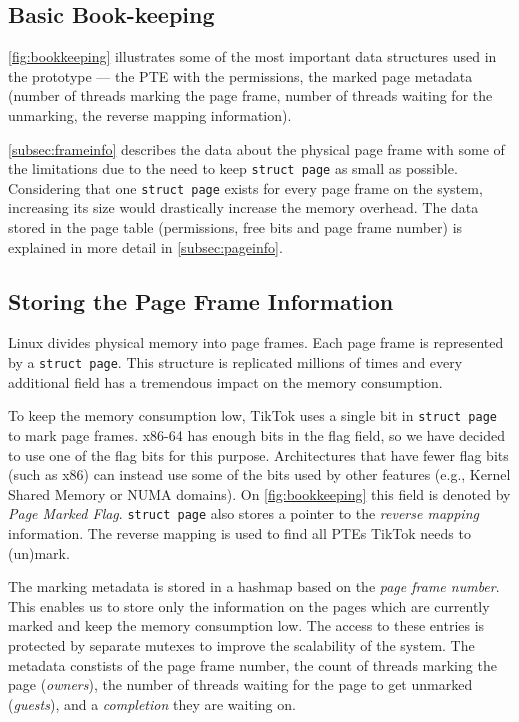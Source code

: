 \documentclass[conference]{IEEEtran}
\newcommand{\sysname}{TikTok}
\begin{document}
\subsection{Basic Book-keeping}
\autoref{fig:bookkeeping} illustrates some of the most important data structures
used in the prototype --- the PTE with the permissions, the marked page metadata
(number of threads marking the page frame, number of threads waiting for the
unmarking, the reverse mapping information). 

\autoref{subsec:frameinfo} describes the data about the physical page frame with
some of the limitations due to the need to keep \texttt{struct page} as small as
possible. Considering that one \texttt{struct page} exists for every page frame
on the system, increasing its size would drastically increase the memory
overhead.  The data stored in the page table (permissions, free bits and page
frame number) is explained in more detail in \autoref{subsec:pageinfo}.

\subsection{Storing the Page Frame Information}
\label{subsec:frameinfo}
Linux divides physical memory into page frames. Each page frame is represented
by a \texttt{struct page}. This structure is replicated millions of times and
every additional field has a tremendous impact on the memory consumption.

To keep the memory consumption low, \sysname{} uses a single bit in \texttt{struct
page} to mark page frames. x86-64 has enough bits in the flag
field, so we have decided to use one of the flag bits for this purpose.
Architectures that have fewer flag bits (such as x86) can instead use some of
the bits used by other features (e.g., Kernel Shared Memory or NUMA domains). On
\autoref{fig:bookkeeping} this field is denoted by \emph{Page Marked Flag}.
\texttt{struct page} also stores a pointer to the \emph{reverse mapping}
information. The reverse mapping is used to find all PTEs \sysname{} needs to
(un)mark.

The marking metadata is stored in a hashmap based on the \emph{page frame
number}. This enables us to store only the information on the pages which are
currently marked and keep the memory consumption low. The access to these entries
is protected by separate mutexes to improve the scalability of the system. The
metadata constists of the page frame number, the count of threads marking the page
(\emph{owners}), the number of threads waiting for the page to get unmarked
(\emph{guests}), and a \emph{completion} they are waiting on. 
\end{document}
